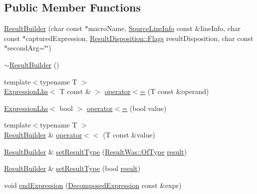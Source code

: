 \subsection*{Public Member Functions}
\begin{DoxyCompactItemize}
\item 
\hyperlink{class_catch_1_1_result_builder_a8579c3056f64f9324cf1181532828376}{Result\+Builder} (char const $\ast$macro\+Name, \hyperlink{struct_catch_1_1_source_line_info}{Source\+Line\+Info} const \&line\+Info, char const $\ast$captured\+Expression, \hyperlink{struct_catch_1_1_result_disposition_a3396cad6e2259af326b3aae93e23e9d8}{Result\+Disposition\+::\+Flags} result\+Disposition, char const $\ast$second\+Arg=\char`\"{}\char`\"{})
\item 
\hyperlink{class_catch_1_1_result_builder_a687d1e9521d97f93c883ab070cc94c64}{$\sim$\+Result\+Builder} ()
\item 
{\footnotesize template$<$typename T $>$ }\\\hyperlink{class_catch_1_1_expression_lhs}{Expression\+Lhs}$<$ T const  \& $>$ \hyperlink{class_catch_1_1_result_builder_ad76939f5a52fcb534f97b49a0b7bc560}{operator$<$=} (T const \&operand)
\item 
\hyperlink{class_catch_1_1_expression_lhs}{Expression\+Lhs}$<$ bool $>$ \hyperlink{class_catch_1_1_result_builder_a3b87b20bcd1ef9e630880e59eeefba2a}{operator$<$=} (bool value)
\item 
{\footnotesize template$<$typename T $>$ }\\\hyperlink{class_catch_1_1_result_builder}{Result\+Builder} \& \hyperlink{class_catch_1_1_result_builder_a5aa79ce6160ab8cd800eb65bbd7a28a4}{operator$<$$<$} (T const \&value)
\item 
\hyperlink{class_catch_1_1_result_builder}{Result\+Builder} \& \hyperlink{class_catch_1_1_result_builder_af896e372db9d7fc90ddeceff3ad110d0}{set\+Result\+Type} (\hyperlink{struct_catch_1_1_result_was_a624e1ee3661fcf6094ceef1f654601ef}{Result\+Was\+::\+Of\+Type} \hyperlink{util_8cpp_ade6d6d18a46c8aa95eed5e179d003e45}{result})
\item 
\hyperlink{class_catch_1_1_result_builder}{Result\+Builder} \& \hyperlink{class_catch_1_1_result_builder_ae504348b073d0360bfd5fc33347ec689}{set\+Result\+Type} (bool \hyperlink{util_8cpp_ade6d6d18a46c8aa95eed5e179d003e45}{result})
\item 
void \hyperlink{class_catch_1_1_result_builder_a864e03b7300271de7cc44b9864463c5a}{end\+Expression} (\hyperlink{struct_catch_1_1_decomposed_expression}{Decomposed\+Expression} const \&expr)

\end{DoxyCompactItemize}

